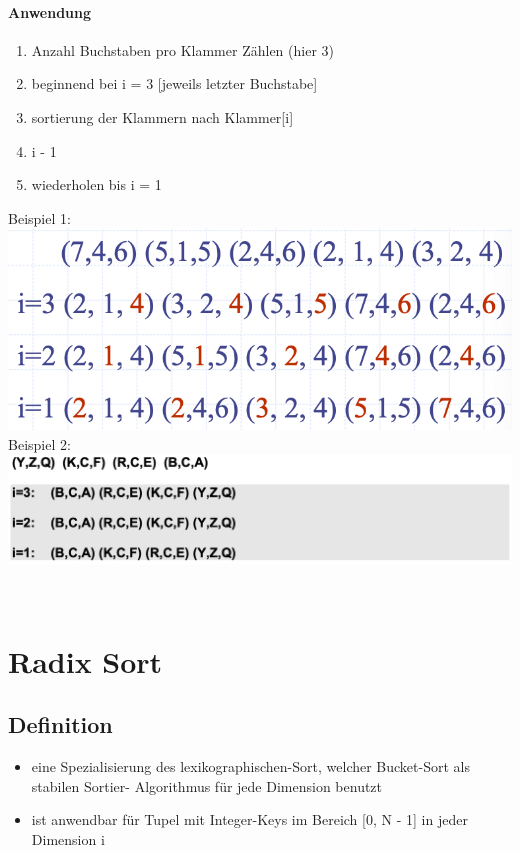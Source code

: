 \paragraph{Anwendung}
\begin{enumerate}
    \item Anzahl Buchstaben pro Klammer Zählen (hier 3)
    \item beginnend bei i = 3 [jeweils letzter Buchstabe]
    \item sortierung der Klammern nach Klammer[i]
    \item i - 1
    \item wiederholen bis i = 1
\end{enumerate}
\begin{center}
    Beispiel 1:\\
    \includegraphics[scale=.3]{graphic/07 RadixSort/lexi.png}\\
    \vspace{6pt}
    Beispiel 2:\\
    \includegraphics[scale=.19]{graphic/07 RadixSort/probepruefung_lexi.png}
\end{center}


\vfill
$ $
\columnbreak


\section{Radix Sort}
\subsection{Definition}
\begin{itemize}
    \item eine Spezialisierung des lexikographischen-Sort, welcher Bucket-Sort als stabilen Sortier- Algorithmus für jede Dimension benutzt
    \item ist anwendbar für Tupel mit Integer-Keys im Bereich [0, N - 1] in jeder Dimension i
\end{itemize}

